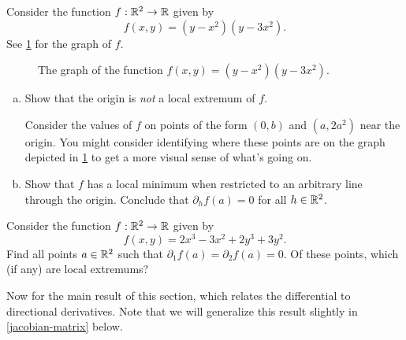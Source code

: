 \begin{exercise} \label{all-directionals-vanish-but-not-extremum}
	Consider the function $f : \mathbb{R}^2 \to \mathbb{R}$ given by 
	\[ f(x, y) = (y- x^2)(y - 3x^2). \]
	See \cref{all-directionals-vanish-but-not-extremum-graph} for the graph of $f$. 
	\begin{figure}[ht]
		\begin{center}
		\end{center}
		\caption{The graph of the function  $f(x,y) = (y- x^2)(y - 3x^2)$.} \label{all-directionals-vanish-but-not-extremum-graph}
	\end{figure}
	\begin{enumerate}[(a)]
		\item Show that the origin is \emph{not} a local extremum of $f$. \begin{hint} Consider the values of $f$ on points of the form $(0,b)$ and $(a, 2a^2)$ near the origin. You might consider identifying where these points are on the graph depicted in \cref{all-directionals-vanish-but-not-extremum-graph} to get a more visual sense of what's going on. \end{hint}
		\item Show that $f$ has a local minimum when restricted to an arbitrary line through the origin. Conclude that $\partial_h f(a) = 0$ for all $h \in \mathbb{R}^2$. 
	\end{enumerate}
\end{exercise}

\begin{exercise}
	Consider the function $f : \mathbb{R}^2 \to \mathbb{R}$ given by
	\[ f(x,y) = 2x^3 - 3x^2 + 2y^3 + 3y^2. \]
	Find all points $a \in \mathbb{R}^2$ such that $\partial_1 f(a) = \partial_2 f(a) = 0$. Of these points, which (if any) are local extremums? 
\end{exercise}

Now for the main result of this section, which relates the differential to directional derivatives. Note that we will generalize this result slightly in \cref{jacobian-matrix} below. 


